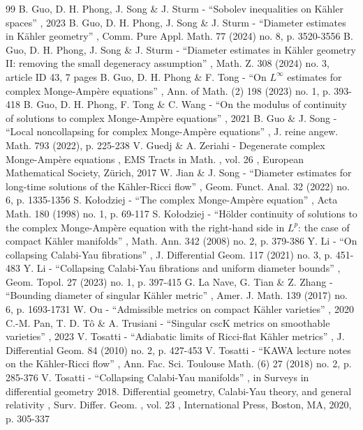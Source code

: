 \documentclass[10pt]{amsart}
\theoremstyle{definition}
\begin{document}
\begin{thebibliography}{99}
 B. Guo, D. H. Phong, J. Song \& J. Sturm - “Sobolev inequalities on Kähler spaces” , 2023
 B. Guo, D. H. Phong, J. Song \& J. Sturm - “Diameter estimates in Kähler geometry” , Comm. Pure Appl. Math. 77 (2024) no. 8, p. 3520-3556
 B. Guo, D. H. Phong, J. Song \& J. Sturm - “Diameter estimates in Kähler geometry II: removing the small degeneracy assumption” , Math. Z. 308 (2024) no. 3, article ID 43, 7 pages
 B. Guo, D. H. Phong \& F. Tong - “On $L^\infty $ estimates for complex Monge-Ampère equations” , Ann. of Math. (2) 198 (2023) no. 1, p. 393-418
 B. Guo, D. H. Phong, F. Tong \& C. Wang - “On the modulus of continuity of solutions to complex Monge-Ampère equations” , 2021
 B. Guo \& J. Song - “Local noncollapsing for complex Monge-Ampère equations” , J. reine angew. Math. 793 (2022), p. 225-238
 V. Guedj \& A. Zeriahi - Degenerate complex Monge-Ampère equations , EMS Tracts in Math. , vol. 26 , European Mathematical Society, Zürich, 2017
 W. Jian \& J. Song - “Diameter estimates for long-time solutions of the Kähler-Ricci flow” , Geom. Funct. Anal. 32 (2022) no. 6, p. 1335-1356
 S. Kołodziej - “The complex Monge-Ampère equation” , Acta Math. 180 (1998) no. 1, p. 69-117
 S. Kołodziej - “Hölder continuity of solutions to the complex Monge-Ampère equation with the right-hand side in $L^p$: the case of compact Kähler manifolds” , Math. Ann. 342 (2008) no. 2, p. 379-386
 Y. Li - “On collapsing Calabi-Yau fibrations” , J. Differential Geom. 117 (2021) no. 3, p. 451-483
 Y. Li - “Collapsing Calabi-Yau fibrations and uniform diameter bounds” , Geom. Topol. 27 (2023) no. 1, p. 397-415
 G. La Nave, G. Tian \& Z. Zhang - “Bounding diameter of singular Kähler metric” , Amer. J. Math. 139 (2017) no. 6, p. 1693-1731
 W. Ou - “Admissible metrics on compact Kähler varieties” , 2020
 C.-M. Pan, T. D. Tô \& A. Trusiani - “Singular cscK metrics on smoothable varieties” , 2023
 V. Tosatti - “Adiabatic limits of Ricci-flat Kähler metrics” , J. Differential Geom. 84 (2010) no. 2, p. 427-453
 V. Tosatti - “KAWA lecture notes on the Kähler-Ricci flow” , Ann. Fac. Sci. Toulouse Math. (6) 27 (2018) no. 2, p. 285-376
 V. Tosatti - “Collapsing Calabi-Yau manifolds” , in Surveys in differential geometry 2018. Differential geometry, Calabi-Yau theory, and general relativity , Surv. Differ. Geom. , vol. 23 , International Press, Boston, MA, 2020, p. 305-337

\end{thebibliography}
\end{document}
